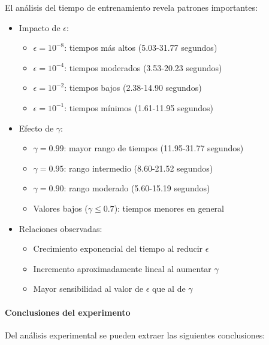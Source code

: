 El análisis del tiempo de entrenamiento revela patrones importantes:

\begin{itemize}
    \item Impacto de $\epsilon$:
    \begin{itemize}
        \item $\epsilon = 10^{-8}$: tiempos más altos (5.03-31.77 segundos)
        \item $\epsilon = 10^{-4}$: tiempos moderados (3.53-20.23 segundos)
        \item $\epsilon = 10^{-2}$: tiempos bajos (2.38-14.90 segundos)
        \item $\epsilon = 10^{-1}$: tiempos mínimos (1.61-11.95 segundos)
    \end{itemize}
    \item Efecto de $\gamma$:
    \begin{itemize}
        \item $\gamma = 0.99$: mayor rango de tiempos (11.95-31.77 segundos)
        \item $\gamma = 0.95$: rango intermedio (8.60-21.52 segundos)
        \item $\gamma = 0.90$: rango moderado (5.60-15.19 segundos)
        \item Valores bajos ($\gamma \leq 0.7$): tiempos menores en general
    \end{itemize}
    \item Relaciones observadas:
    \begin{itemize}
        \item Crecimiento exponencial del tiempo al reducir $\epsilon$
        \item Incremento aproximadamente lineal al aumentar $\gamma$
        \item Mayor sensibilidad al valor de $\epsilon$ que al de $\gamma$
    \end{itemize}
\end{itemize}

\paragraph{Conclusiones del experimento}

Del análisis experimental se pueden extraer las siguientes conclusiones:

